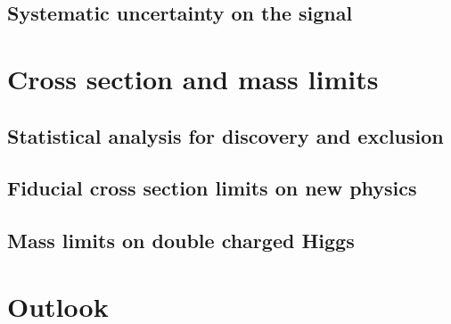 \subsection{Systematic uncertainty on the signal}

\section{Cross section and mass limits}
\subsection{Statistical analysis for discovery and exclusion}
\subsection{Fiducial cross section limits on new physics}
\subsection{Mass limits on double charged Higgs}

\section{Outlook}
\label{sec:wprimeConclusion}


